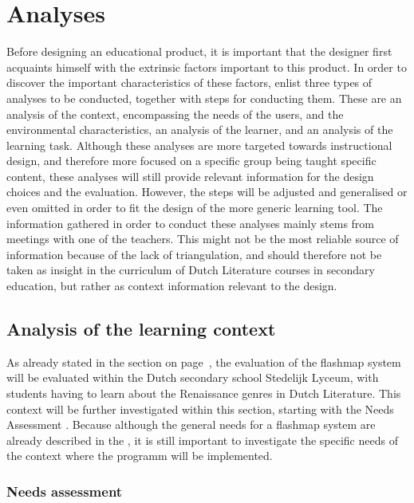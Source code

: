 \chapter{Analyses}

\label{ch:analysis}

Before designing an educational product, it is important that the designer first acquaints himself with the extrinsic factors important to this product. In order to discover the important characteristics of these factors,  enlist three types of analyses to be conducted, together with steps for conducting them. These are an analysis of the context, encompassing the needs of the users, and the environmental characteristics, an analysis of the learner, and an analysis of the learning task. Although these analyses are more targeted towards instructional design, and therefore more focused on a specific group being taught specific content, these analyses will still provide relevant information for the design choices and the evaluation. However, the steps will be adjusted and generalised or even omitted in order to fit the design of the more generic learning tool. The information gathered in order to conduct these analyses mainly stems from meetings with one of the teachers. This might not be the most reliable source of information because of the lack of triangulation, and should therefore not be taken as insight in the curriculum of Dutch Literature courses in secondary education, but rather as context information relevant to the design.

\section{Analysis of the learning context}

As already stated in the  section on page~\pageref{sec:intro_evaluation}, the evaluation of the flashmap system will be evaluated within the Dutch secondary school Stedelijk Lyceum, with students having to learn about the Renaissance genres in Dutch Literature. This context will be further investigated within this section, starting with the Needs Assessment \cite{instructionaldesign}. Because although the general needs for a flashmap system are already described in the , it is still important to investigate the specific needs of the context where the programm will be implemented.

\subsection{Needs assessment}

